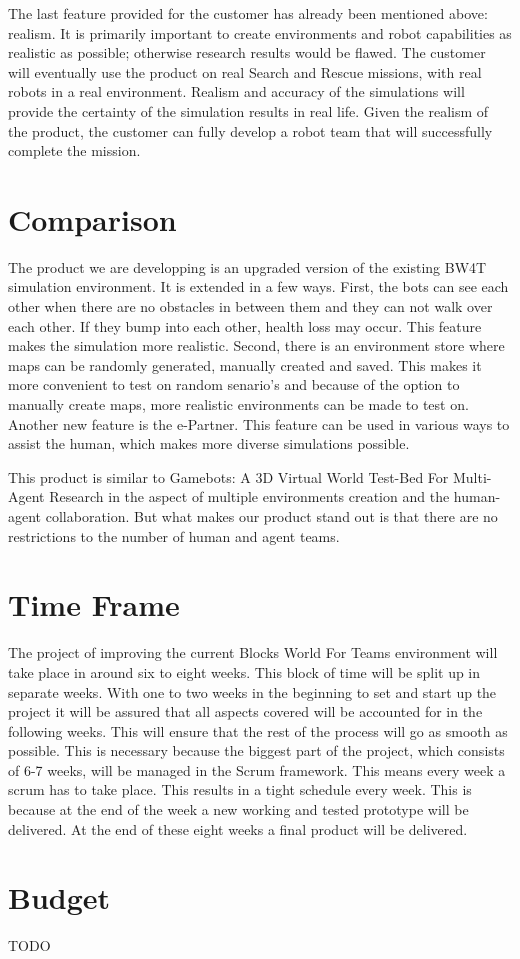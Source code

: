 \documentclass[a4paper]{article}
\begin{document}
The last feature provided for the customer has already been mentioned above: realism. It is primarily important to create environments and robot capabilities as realistic as possible; otherwise research results would be flawed. The customer will eventually use the product on real Search and Rescue missions, with real robots in a real environment. Realism and accuracy of the simulations will provide the certainty of the simulation results in real life. Given the realism of the product, the customer can fully develop a robot team that will successfully complete the mission. 

\section{Comparison}
The product we are developping is an upgraded version of the existing BW4T simulation environment. It is extended in a few ways. First, the bots can see each other when there are no obstacles in between them and they can not walk over each other. If they bump into each other, health loss may occur. This feature makes the simulation more realistic. Second, there is an environment store where maps can be randomly generated, manually created and saved. This makes it more convenient to test on random senario's and because of the option to manually create maps, more realistic environments can be made to test on. Another new feature is the e-Partner. This feature can be used in various ways to assist the human, which makes more diverse simulations possible.

This product is similar to Gamebots: A 3D Virtual World Test-Bed For Multi-Agent Research \cite{adobbati2001gamebots} in the aspect of multiple environments creation and the human-agent collaboration. But what makes our product stand out is that there are no restrictions to the number of human and agent teams.

\section{Time Frame}
The project of improving the current Blocks World For Teams environment will take place in around six to eight weeks. This block of time will be split up in separate weeks. With one to two weeks in the beginning to set and start up the project it will be assured that all aspects covered will be accounted for in the following weeks. This will ensure that the rest of the process will go as smooth as possible. This is necessary because the biggest part of the project, which consists of 6-7 weeks, will be managed in the Scrum framework. This means every week a scrum has to take place. This results in a tight schedule every week. This is because at the end of the week a new working and tested prototype will be delivered. At the end of these eight weeks a final product will be delivered.

\section{Budget}
TODO

\clearpage


\end{document}
